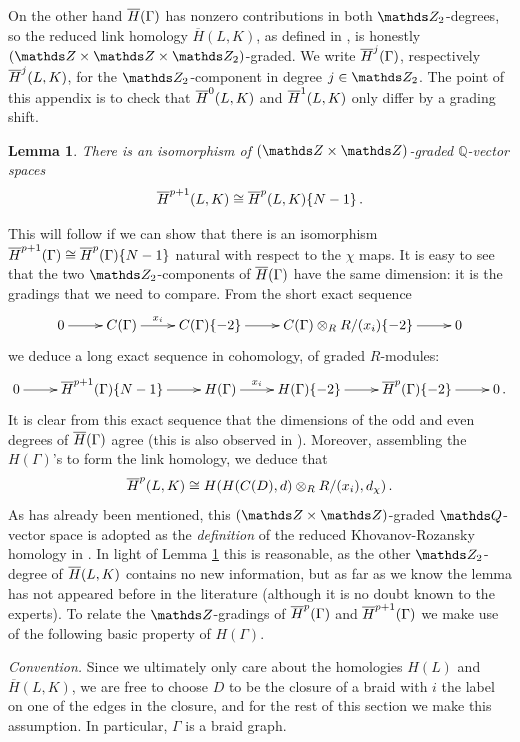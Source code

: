 \documentclass{compositio}
\newtheorem{lemma}[theorem]{Lemma}
\theoremstyle{definition}
\numberwithin{equation}{section}
\begin{document}
On the other hand $\overline{H}(\Gamma)$ has nonzero contributions in both $\Ztwo$-degrees, so the reduced link homology $\overline{H}(L,K)$, as defined in \cite{kr0401268}, is honestly $(\ZZ \times \ZZ \times \Ztwo)$-graded. We write $\overline{H}^j(\Gamma)$, respectively $\overline{H}^j(L,K)$, for the $\Ztwo$-component in degree $j \in \Ztwo$. The point of this appendix is to check that $\overline{H}^0(L,K)$ and $\overline{H}^1(L,K)$ only differ by a grading shift.

\begin{lemma}\label{lemma:redvsunred} There is an isomorphism of $(\ZZ \times \ZZ)$-graded $\mathds{Q}$-vector spaces 
\[
\overline{H}^{p+1}(L,K) \cong \overline{H}^{p}(L,K)\{N-1\} \, .
\]
\end{lemma}

This will follow if we can show that there is an isomorphism $\overline{H}^{p+1}(\Gamma) \cong \overline{H}^p(\Gamma)\{N-1\}$ natural with respect to the $\chi$ maps. It is easy to see that the two $\Ztwo$-components of $\overline{H}(\Gamma)$ have the same dimension: it is the gradings that we need to compare. From the short exact sequence
\[
\xymatrix{%
0 \ar[r] & C(\Gamma) \ar[r]^-{x_{i}} & C(\Gamma)\{-2\} \ar[r] & C(\Gamma) \otimes_R R/(x_{i})\{-2\} \ar[r] & 0
}
\]
we deduce a long exact sequence in cohomology, of graded $R$-modules:
\begin{equation}\label{eq:redvsunred_seq}
\xymatrix{%
0 \ar[r] & \redh^{p+1}(\Gamma)\{N-1\} \ar[r] & H(\Gamma) \ar[r]^-{x_{i}} & H(\Gamma)\{-2\} \ar[r] & \redh^p(\Gamma)\{-2\} \ar[r] & 0 \, .
}
\end{equation}
It is clear from this exact sequence that the dimensions of the odd and even degrees of $\overline{H}(\Gamma)$ agree (this is also observed in \cite[Proposition 3.12]{r0607544}). Moreover, assembling the $H(\Gamma)$'s to form the link homology, we deduce that
\[
\overline{H}^p(L, K) \cong H(H(C(D),d) \otimes_R R/(x_i), d_{\chi})\,.
\]
As has already been mentioned, this $(\ZZ \times \ZZ)$-graded $\QQ$-vector space is adopted as the \emph{definition} of the reduced Khovanov-Rozansky homology in \cite{r0607544,w0610650}. In light of Lemma \ref{lemma:redvsunred} this is reasonable, as the other $\Ztwo$-degree of $\overline{H}(L,K)$ contains no new information, but as far as we know the lemma has not appeared before in the literature (although it is no doubt known to the experts). To relate the $\ZZ$-gradings of $\overline{H}^p(\Gamma)$ and $\overline{H}^{p+1}(\Gamma)$ we make use of the following basic property of $H(\Gamma)$.

\textit{Convention.} Since we ultimately only care about the homologies $H(L)$ and $\overline{H}(L,K)$, we are free to choose $D$ to be the closure of a braid with $i$ the label on one of the edges in the closure, and for the rest of this section we make this assumption. In particular, $\Gamma$ is a braid graph.
\end{document}
